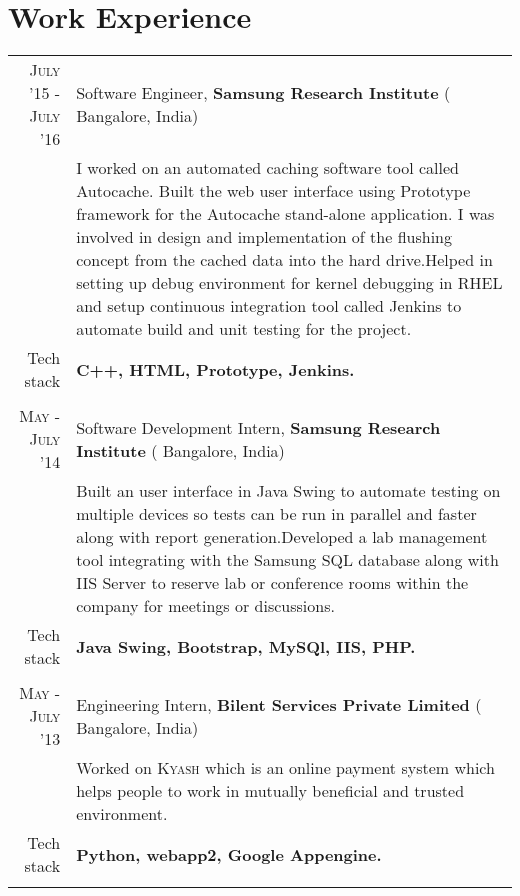 \section{Work Experience}
\renewcommand{\arraystretch}{0.85}%
\begin{tabular}{r|p{14cm}}

\textsc{July '15 - July '16} & Software Engineer, \textbf{Samsung Research Institute} ( Bangalore, India) \\
& \small{I worked on an automated caching software tool called Autocache. Built the web user interface using Prototype framework for the Autocache stand-alone application. I was involved in design and implementation of the flushing concept from the cached data into the hard drive.Helped in setting up debug environment for kernel debugging in RHEL and setup continuous integration tool called Jenkins to automate build and unit testing for the project.}\\
\small{Tech stack} &\footnotesize{\textbf{C++, HTML, Prototype, Jenkins.}} \\
\multicolumn{2}{c}{} \\

\textsc{May - July '14} & Software Development Intern, \textbf{Samsung Research Institute} ( Bangalore, India) \\
& \small{Built an user interface in Java Swing to automate testing on multiple devices so tests can be run in parallel and faster along with report generation.Developed a lab management tool integrating with the Samsung SQL database along with IIS Server to reserve lab or conference rooms within the company for meetings or discussions.}\\
\small{Tech stack} &\footnotesize{\textbf{Java Swing, Bootstrap, MySQl, IIS, PHP.}} \\
\multicolumn{2}{c}{} \\

\textsc{May - July '13} & Engineering Intern, \textbf{Bilent Services Private Limited} ( Bangalore, India)\\
& \small{Worked on \textsc{Kyash} which is an online payment system which helps people to work in mutually beneficial and trusted environment.}\\
\small{Tech stack} &\footnotesize{\textbf{Python, webapp2, Google Appengine.}} \\
\multicolumn{2}{c}{} \\
\end{tabular}
